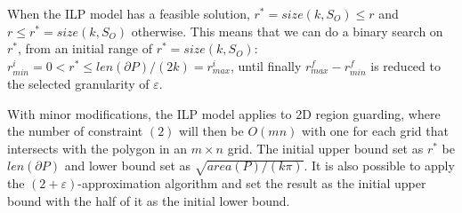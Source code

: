When the ILP model has a feasible solution, $r^* = size(k, S_O) \leq r$ 
and $r\leq r^* = size(k, S_O) $ otherwise. This means that we can do a binary 
search on $r^*$, from an initial range of $r^* = size(k, S_O)$: $r_{min}^i=0 
<  r^* \leq {len(\partial P)}/({2k})=r_{max}^i$, until finally $r^f_{max} - 
r^f_{min}$ is reduced to the selected granularity of $\varepsilon$.

\begin{remark}
    With minor modifications, the ILP model applies to 2D region 
		guarding, where the number of constraint $(2)$ will then be $O(mn)$ 
		with one for each grid that intersects with the polygon in an $m\times n$ 
		grid. The initial upper bound set as $r^*$ be $len(\partial P)$ and 
		lower bound set as $\sqrt{{area(P)}/({k\pi})}$. It is also possible to 
		apply the $(2+\varepsilon)$-approximation algorithm and set the result 
		as the initial upper bound with the half of it as the initial lower 
		bound.
\end{remark}

